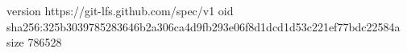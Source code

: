 version https://git-lfs.github.com/spec/v1
oid sha256:325b3039785283646b2a306ca4d9fb293e06f8d1dcd1d53c221ef77bdc22584a
size 786528
